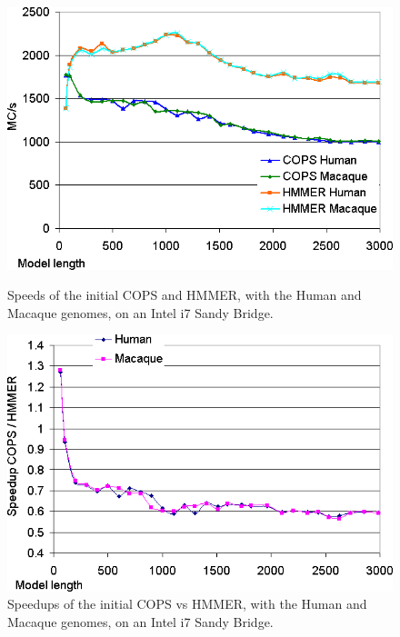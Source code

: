 \begin{figure}[h!]
    \begin{minipage}{0.48\linewidth}
		\centering
		\includegraphics[scale=0.46]{graphics/initial-larissa-runtimes.png}
		\caption[Speeds for the Inter-task vectorization on an Intel i7 Sandy Bridge] 
		{Speeds of the initial COPS and HMMER, with the Human and Macaque genomes, on an Intel i7 Sandy Bridge.}
		\label{initial-larissa-runtimes}
    \end{minipage}
    \hspace{0.04\linewidth}
    \begin{minipage}{0.48\linewidth}
		\centering
		\includegraphics[scale=0.46]{graphics/initial-larissa-speedups.png}
		\caption[Speedups for the Inter-task vectorization on an Intel i7 Sandy Bridge]
		{Speedups of the initial COPS vs HMMER, with the Human and Macaque genomes, on an Intel i7 Sandy Bridge.}
		\label{initial-larissa-speedups}
    \end{minipage}
\end{figure} 


